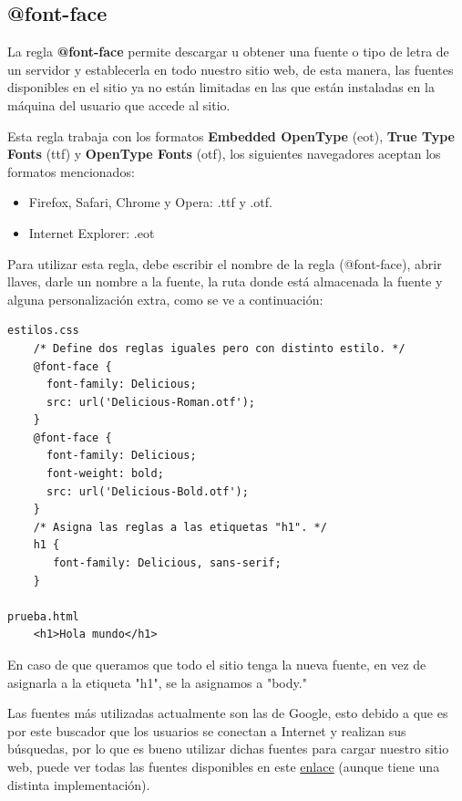 \subsection{@font-face}

La regla \textbf{@font-face} permite descargar u obtener una fuente o tipo de letra de un servidor y establecerla en todo nuestro sitio web, de esta manera, las fuentes disponibles en el sitio ya no están limitadas en las que están instaladas en la máquina del usuario que accede al sitio.

Esta regla trabaja con los formatos \textbf{Embedded OpenType} (eot), \textbf{True Type Fonts} (ttf) y \textbf{OpenType Fonts} (otf), los siguientes navegadores aceptan los formatos mencionados:
\begin{itemize}
    \item Firefox, Safari, Chrome y Opera: .ttf y .otf.
    \item Internet Explorer: .eot
\end{itemize}

Para utilizar esta regla, debe escribir el nombre de la regla (@font-face), abrir llaves, darle un nombre a la fuente, la ruta donde está almacenada la fuente y alguna personalización extra, como se ve a continuación:
\begin{lstlisting}
estilos.css
    /* Define dos reglas iguales pero con distinto estilo. */
    @font-face {
      font-family: Delicious; 
      src: url('Delicious-Roman.otf'); 
    } 
    @font-face { 
      font-family: Delicious; 
      font-weight: bold; 
      src: url('Delicious-Bold.otf'); 
    }
    /* Asigna las reglas a las etiquetas "h1". */
    h1 {
       font-family: Delicious, sans-serif; 
    }

prueba.html
    <h1>Hola mundo</h1>
\end{lstlisting}

En caso de que queramos que todo el sitio tenga la nueva fuente, en vez de asignarla a la etiqueta "h1", se la asignamos a "body."

Las fuentes más utilizadas actualmente son las de Google, esto debido a que es por este buscador que los usuarios se conectan a Internet y realizan sus búsquedas, por lo que es bueno utilizar dichas fuentes para cargar nuestro sitio web, puede ver todas las fuentes disponibles en este \href{https://fonts.google.com/}{enlace} (aunque tiene una distinta implementación).

